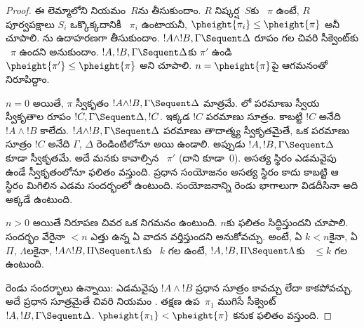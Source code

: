 \documentclass[../../../include/open-logic-section]{subfiles}
\begin{document}
\begin{proof}
ఈ లెమ్మాలోని  నియమం~$R$ను తీసుకుందాం. $R$ నిష్కర్ష~$S$కు ~$\pi$ ఉంటే, $R$ పూర్వపక్షాలు $S_i$ ఒక్కొక్కదానికీ ~$\pi_i$ ఉంటాయనీ, $\pheight{\pi_i}
\le \pheight{\pi}$ అనీ చూపాలి. \LeftR{\land}ను ఉదాహరణగా తీసుకుందాం. $!A \land !B, \Gamma
\Sequent \Delta$ రూపం గల చివరి సీక్వెంట్‌కు ~$\pi$ ఉందని అనుకుందాం. $!A, !B, \Gamma \Sequent \Delta$కు  $\pi'$ ఉండి $\pheight{\pi'} \le
\pheight{\pi}$ అని చూపాలి. $n = \pheight{\pi}$పై ఆగమనంతో నిరూపిద్దాం.

$n = 0$ అయితే, $\pi$ స్వీకృతం $!A \land !B, \Gamma
\Sequent \Delta$ మాత్రమే. లో పరమాణు స్వీయ స్వీకృతాల రూపం $!C, \Gamma
\Sequent \Delta, !C$. ఇక్కడ $!C$ పరమాణు సూత్రం. కాబట్టి $!C$ అనేది $!A \land !B$ కాలేదు. $!A \land !B, \Gamma \Sequent \Delta$ పరమాణు తాదాత్మ్య స్వీకృతమైతే, ఒక పరమాణు సూత్రం $!C$ అనేది $\Gamma$, $\Delta$ రెండింటిలోనూ  అయి ఉండాలి. అప్పుడు $!A, !B, \Gamma \Sequent \Delta$ కూడా స్వీకృతమే. అదే మనకు కావాల్సిన ~$\pi'$ (దాని  కూడా~$0$). అసత్య స్థిరం ఎడమవైపు ఉండే స్వీకృతంలోనూ ఫలితం వస్తుంది. ప్రధాన సంయోజనం అసత్య స్థిరం కాదు కాబట్టి ఆ స్థిరం మిగిలిన ఎడమ సందర్భంలో ఉంటుంది. సంయోజనాన్ని రెండు భాగాలుగా విడదీసినా అది అక్కడే ఉంటుంది.


$n>0$ అయితే నిరూపణ చివర ఒక నిగమనం ఉంటుంది. $n$కు ఫలితం సిద్ధిస్తుందని చూపాలి. సందర్భం వేరైనా $<n$ ఎత్తు ఉన్న ఏ  వాదన వర్తిస్తుందని అనుకోవచ్చు. అంటే, ఏ $k<n$కైనా, ఏ $\Pi$, $\Lambda$లకైనా, $!A \land !B, \Pi \Sequent \Lambda$కు ~$k$ గల  ఉంటే, $!A, !B, \Pi \Sequent \Lambda$కు ~$\le k$ గల  ఉంటుంది.

రెండు సందర్భాలు ఉన్నాయి: ఎడమవైపు $!A \land
!B$ ప్రధాన సూత్రం కావచ్చు లేదా కాకపోవచ్చు. అదే ప్రధాన సూత్రమైతే చివరి నియమం \LeftR{\land}. తక్షణ ఉప~$\pi_1$ ముగిసే సీక్వెంట్ $!A, !B, \Gamma \Sequent \Delta$. $\pheight{\pi_1} < \pheight{\pi}$ కనుక ఫలితం వస్తుంది.


\end{proof}
\end{document}
